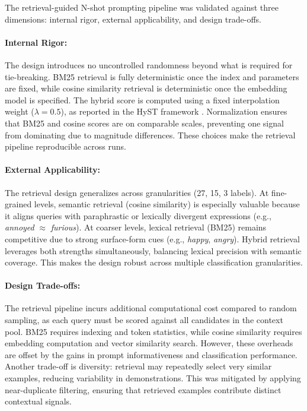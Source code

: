 The retrieval-guided N-shot prompting pipeline was validated against three dimensions: internal rigor, external applicability, and design trade-offs. 

\paragraph{Internal Rigor:}  
The design introduces no uncontrolled randomness beyond what is required for tie-breaking. 
BM25 retrieval is fully deterministic once the index and parameters are fixed, while cosine similarity retrieval is deterministic once the embedding model is specified. 
The hybrid score is computed using a fixed interpolation weight ($\lambda=0.5$), as reported in the HyST framework \cite{hyst2025}. 
Normalization ensures that BM25 and cosine scores are on comparable scales, preventing one signal from dominating due to magnitude differences. 
These choices make the retrieval pipeline reproducible across runs.  

\paragraph{External Applicability:}  
The retrieval design generalizes across granularities (27, 15, 3 labels). 
At fine-grained levels, semantic retrieval (cosine similarity) is especially valuable because it aligns queries with paraphrastic or lexically divergent expressions (e.g., \emph{annoyed} $\approx$ \emph{furious}). 
At coarser levels, lexical retrieval (BM25) remains competitive due to strong surface-form cues (e.g., \emph{happy}, \emph{angry}). 
Hybrid retrieval leverages both strengths simultaneously, balancing lexical precision with semantic coverage. 
This makes the design robust across multiple classification granularities.  

\paragraph{Design Trade-offs:}  
The retrieval pipeline incurs additional computational cost compared to random sampling, as each query must be scored against all candidates in the context pool. 
BM25 requires indexing and token statistics, while cosine similarity requires embedding computation and vector similarity search. 
However, these overheads are offset by the gains in prompt informativeness and classification performance. 
Another trade-off is diversity: retrieval may repeatedly select very similar examples, reducing variability in demonstrations. 
This was mitigated by applying near-duplicate filtering, ensuring that retrieved examples contribute distinct contextual signals.  

